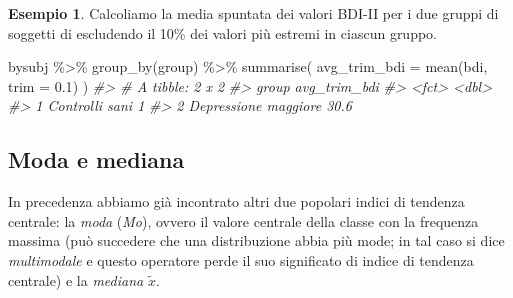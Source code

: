 \documentclass[
  10pt,
  italian,
  a4paper,
  extrafontsizes,onecolumn,openright
  ]{memoir}
\newenvironment{Shaded}{\begin{snugshade}}{\end{snugshade}}
\newcommand{\AttributeTok}[1]{\textcolor[rgb]{0.77,0.63,0.00}{#1}}
\newcommand{\CommentTok}[1]{\textcolor[rgb]{0.56,0.35,0.01}{\textit{#1}}}
\newcommand{\FloatTok}[1]{\textcolor[rgb]{0.00,0.00,0.81}{#1}}
\newcommand{\FunctionTok}[1]{\textcolor[rgb]{0.00,0.00,0.00}{#1}}
\newcommand{\NormalTok}[1]{#1}
\newcommand{\SpecialCharTok}[1]{\textcolor[rgb]{0.00,0.00,0.00}{#1}}
\theoremstyle{definition}
\theoremstyle{definition}
\newtheorem{example}{Esempio}[chapter]
\theoremstyle{definition}
\theoremstyle{definition}
\theoremstyle{remark}
\begin{document}
\begin{example}

Calcoliamo la media spuntata dei valori BDI-II per i due gruppi di soggetti di \textcite{zetschefuture2019} escludendo il 10\% dei valori più estremi in ciascun gruppo.

\begin{Shaded}
\begin{Highlighting}[]
\NormalTok{bysubj }\SpecialCharTok{\%\textgreater{}\%} 
  \FunctionTok{group\_by}\NormalTok{(group) }\SpecialCharTok{\%\textgreater{}\%} 
  \FunctionTok{summarise}\NormalTok{(}
    \AttributeTok{avg\_trim\_bdi =} \FunctionTok{mean}\NormalTok{(bdi, }\AttributeTok{trim =} \FloatTok{0.1}\NormalTok{)}
\NormalTok{  ) }
\CommentTok{\#\textgreater{} \# A tibble: 2 x 2}
\CommentTok{\#\textgreater{}   group                avg\_trim\_bdi}
\CommentTok{\#\textgreater{}   \textless{}fct\textgreater{}                       \textless{}dbl\textgreater{}}
\CommentTok{\#\textgreater{} 1 Controlli sani                1  }
\CommentTok{\#\textgreater{} 2 Depressione maggiore         30.6}
\end{Highlighting}
\end{Shaded}

\end{example}

\hypertarget{moda-e-mediana}{%
\subsection{Moda e mediana}\label{moda-e-mediana}}

In precedenza abbiamo già incontrato altri due popolari indici di
tendenza centrale: la \emph{moda} (\emph{Mo}), ovvero il valore centrale della
classe con la frequenza massima (può succedere che una distribuzione
abbia più mode; in tal caso si dice \emph{multimodale} e questo operatore
perde il suo significato di indice di tendenza centrale) e la \emph{mediana}
\(\tilde{x}\).
\end{document}
